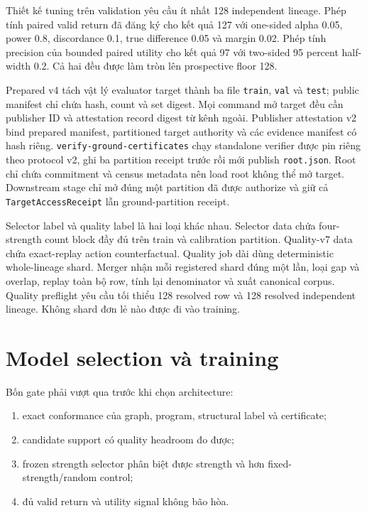 \documentclass[
  vietnamese,
  10pt,
  a4paper,
]{article}
\providecommand{\tightlist}{%
  \setlength{\itemsep}{0pt}\setlength{\parskip}{0pt}}
\begin{document}
Thiết kế tuning trên validation yêu cầu ít nhất 128 independent lineage.
Phép tính paired valid return đã đăng ký cho kết quả 127 với one-sided
alpha 0.05, power 0.8, discordance 0.1, true difference 0.05 và margin
0.02. Phép tính precision của bounded paired utility cho kết quả 97 với
two-sided 95 percent half-width 0.2. Cả hai đều được làm tròn lên
prospective floor 128.

Prepared v4 tách vật lý evaluator target thành ba file \texttt{train},
\texttt{val} và \texttt{test}; public manifest chỉ chứa hash, count và
set digest. Mọi command mở target đều cần publisher ID và attestation
record digest từ kênh ngoài. Publisher attestation v2 bind prepared
manifest, partitioned target authority và các evidence manifest có hash
riêng. \texttt{verify-ground-certificates} chạy standalone verifier được
pin riêng theo protocol v2, ghi ba partition receipt trước rồi mới
publish \texttt{root.json}. Root chỉ chứa commitment và census metadata
nên load root không thể mở target. Downstream stage chỉ mở đúng một
partition đã được authorize và giữ cả \texttt{TargetAccessReceipt} lẫn
ground-partition receipt.

Selector label và quality label là hai loại khác nhau. Selector data
chứa four-strength count block đầy đủ trên train và calibration
partition. Quality-v7 data chứa exact-replay action counterfactual.
Quality job dài dùng deterministic whole-lineage shard. Merger nhận mỗi
registered shard đúng một lần, loại gap và overlap, replay toàn bộ row,
tính lại denominator và xuất canonical corpus. Quality preflight yêu cầu
tối thiểu 128 resolved row và 128 resolved independent lineage. Không
shard đơn lẻ nào được đi vào training.

\section{Model selection và
training}\label{model-selection-vuxe0-training}

Bốn gate phải vượt qua trước khi chọn architecture:

\begin{enumerate}
\def\labelenumi{\arabic{enumi}.}
\tightlist
\item
  exact conformance của graph, program, structural label và certificate;
\item
  candidate support có quality headroom đo được;
\item
  frozen strength selector phân biệt được strength và hơn
  fixed-strength/random control;
\item
  đủ valid return và utility signal không bão hòa.
\end{enumerate}
\end{document}
